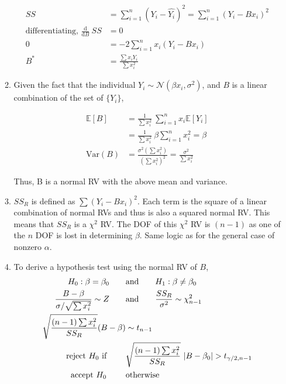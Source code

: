 \begin{enumerate}
\begin{enumerate}
	\begin{align}
		SS &= \sum\limits_{i = 1}^{n} (Y_i - \widehat{Y_i})^2 = \sum\limits_{i = 1}^{n} (Y_i - Bx_i)^2 \nonumber \\
		\text{differentiating, }\frac{\mathrm{d}}{\mathrm{d}B}\ SS &= 0 \nonumber \\
		0 &= -2 \sum\limits_{i = 1}^{n} x_i  (Y_i - Bx_i) \nonumber \\
		B^* &= \frac{\sum x_i Y_i}{\sum x_i^2}
	\end{align}

	\item  Given the fact that the individual $ Y_i \sim \mathcal{N}(\beta x_i, \sigma^2) $, and $ B $ is a linear combination of the set of $ \{Y_i\} $,

	\begin{align}
		\mathbb{E}[B] &= \frac{1}{\sum x_i^2}\ \sum\limits_{i = 1}^{n} x_i \mathbb{E}[Y_i] \nonumber \\
		&= \frac{1}{\sum x_i^2}\ \beta \sum\limits_{i = 1}^{n} x_i^2 = \beta \\
		\mathrm{Var}(B) &= \frac{\sigma^2 (\sum x_i^2)}{(\sum x_i^2)^2} = \frac{\sigma^2}{\sum x_i^2}
	\end{align}
	
	Thus, B is a normal RV with the above mean and variance.
	
	\item $ SS_R $ is defined as $ \sum (Y_i - Bx_i)^2 $. Each term is the square of a linear combination of normal RVs and thus is also a squared normal RV. This means that $ SS_R $ is a $ \chi^2 $ RV.
	The DOF of this $ \chi^2 $ RV is $ (n-1) $ as one of the $ n $ DOF is lost in determining $ \beta $. Same logic as for the general case of nonzero $ \alpha $.
	
	\item To derive a hypothesis test using the normal RV of $ B $,
	\begin{align}
		H_0 : \beta = \beta_0 \qquad &\text{and} \qquad H_1 : \beta \neq \beta_0 \nonumber \\
		\frac{B - \beta}{\sigma / \sqrt{\sum x_i^2}} \sim Z \qquad &\text{and} \qquad \frac{SS_R}{\sigma^2} \sim \chi^2_{n-1}\\
		\sqrt{\frac{(n-1)\sum x_i^2}{SS_R}} (B - \beta) &\sim t_{n-1} \nonumber \\
		\text{reject $ H_0 $ if } \qquad & \sqrt{\frac{(n-1) \sum x_i^2}{SS_R}}\ |B - \beta_0| > t_{\gamma/2, n-1} \nonumber \\
		\text{accept $ H_0 $  } \qquad & \text{otherwise}
	\end{align}


\end{enumerate}
\end{enumerate}
